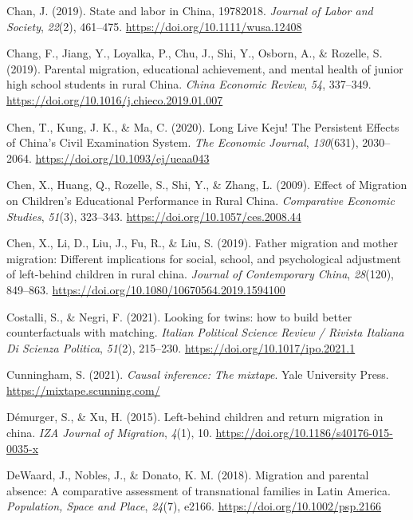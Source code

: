 \documentclass[
  man,floatsintext]{apa7}
\newlength{\cslhangindent}
\newlength{\cslentryspacingunit} %
\newenvironment{CSLReferences}[2] %
 {%
  \setlength{\parindent}{0pt}
  \ifodd #1
  \let\oldpar\par
  \def\par{\hangindent=\cslhangindent\oldpar}
  \fi
  \setlength{\parskip}{#2\cslentryspacingunit}
 }%
 {}
\begin{document}
\begin{CSLReferences}{1}{0}
\leavevmode{}%
Chan, J. (2019). State and labor in China, 1978{\textendash}2018. \emph{Journal of Labor and Society}, \emph{22}(2), 461--475. \url{https://doi.org/10.1111/wusa.12408}

\leavevmode{}%
Chang, F., Jiang, Y., Loyalka, P., Chu, J., Shi, Y., Osborn, A., \& Rozelle, S. (2019). Parental migration, educational achievement, and mental health of junior high school students in rural China. \emph{China Economic Review}, \emph{54}, 337--349. \url{https://doi.org/10.1016/j.chieco.2019.01.007}

\leavevmode{}%
Chen, T., Kung, J. K., \& Ma, C. (2020). Long Live Keju! The Persistent Effects of China{'}s Civil Examination System. \emph{The Economic Journal}, \emph{130}(631), 2030--2064. \url{https://doi.org/10.1093/ej/ueaa043}

\leavevmode{}%
Chen, X., Huang, Q., Rozelle, S., Shi, Y., \& Zhang, L. (2009). Effect of Migration on Children's Educational Performance in Rural China. \emph{Comparative Economic Studies}, \emph{51}(3), 323--343. \url{https://doi.org/10.1057/ces.2008.44}

\leavevmode{}%
Chen, X., Li, D., Liu, J., Fu, R., \& Liu, S. (2019). Father migration and mother migration: Different implications for social, school, and psychological adjustment of left-behind children in rural china. \emph{Journal of Contemporary China}, \emph{28}(120), 849--863. \url{https://doi.org/10.1080/10670564.2019.1594100}

\leavevmode{}%
Costalli, S., \& Negri, F. (2021). Looking for twins: how to build better counterfactuals with matching. \emph{Italian Political Science Review / Rivista Italiana Di Scienza Politica}, \emph{51}(2), 215--230. \url{https://doi.org/10.1017/ipo.2021.1}

\leavevmode{}%
Cunningham, S. (2021). \emph{Causal inference: The mixtape}. Yale University Press. \url{https://mixtape.scunning.com/}

\leavevmode{}%
Démurger, S., \& Xu, H. (2015). Left-behind children and return migration in china. \emph{IZA Journal of Migration}, \emph{4}(1), 10. \url{https://doi.org/10.1186/s40176-015-0035-x}

\leavevmode{}%
DeWaard, J., Nobles, J., \& Donato, K. M. (2018). Migration and parental absence: A comparative assessment of transnational families in Latin America. \emph{Population, Space and Place}, \emph{24}(7), e2166. \url{https://doi.org/10.1002/psp.2166}


\end{CSLReferences}
\end{document}

